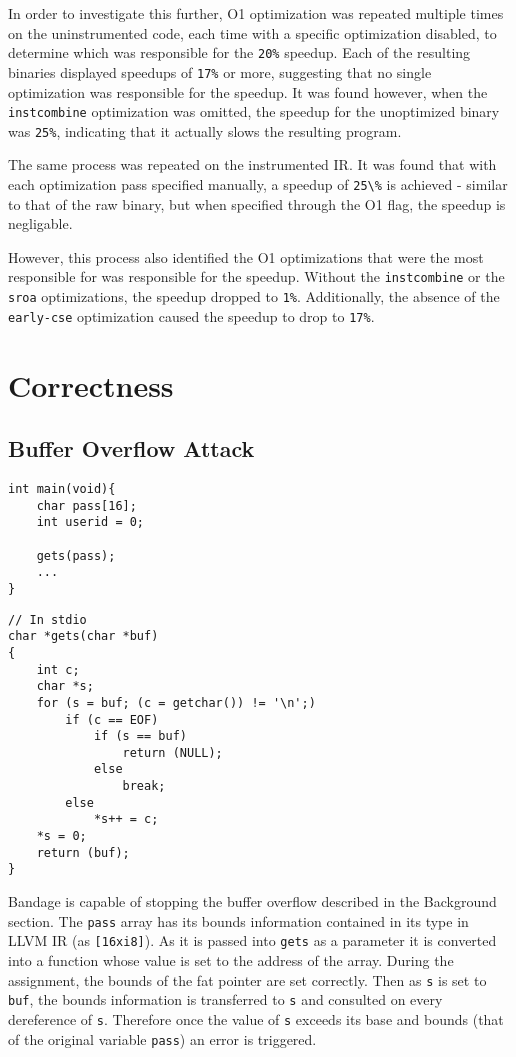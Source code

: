 In order to investigate this further, O1 optimization was repeated multiple times on the uninstrumented code, each time with a specific optimization disabled, to determine which was responsible for the \verb!20%! speedup.
Each of the resulting binaries displayed speedups of \verb!17%! or more, suggesting that no single optimization was responsible for the speedup.
It was found however, when the \verb!instcombine! optimization was omitted, the speedup for the unoptimized binary was \verb!25%!, indicating that it actually slows the resulting program.

The same process was repeated on the instrumented IR.
It was found that with each optimization pass specified manually, a speedup of \verb!25\%! is achieved - similar to that of the raw binary, but when specified through the O1 flag, the speedup is negligable.

However, this process also identified the O1 optimizations that were the most responsible for was responsible for the speedup.
Without the \verb!instcombine! or the \verb!sroa! optimizations, the speedup dropped to \verb!1%!.
Additionally, the absence of the \verb!early-cse! optimization caused the speedup to drop to \verb!17%!.

\section{Correctness}

\subsection{Buffer Overflow Attack}

\begin{verbatim}
int main(void){
    char pass[16];
    int userid = 0;

    gets(pass);
    ...
}
\end{verbatim}

\begin{verbatim}
// In stdio
char *gets(char *buf)
{
    int c;
    char *s;
    for (s = buf; (c = getchar()) != '\n';)
        if (c == EOF)
            if (s == buf)
                return (NULL);
            else
                break;
        else
            *s++ = c;
    *s = 0;
    return (buf);
}
\end{verbatim}
Bandage is capable of stopping the buffer overflow described in the Background section.
The \verb!pass! array has its bounds information contained in its type in LLVM IR (as \verb![16xi8]!).
As it is passed into \verb!gets! as a parameter it is converted into a function whose value is set to the address of the array.
During the assignment, the bounds of the fat pointer are set correctly.
Then as \verb!s! is set to \verb!buf!, the bounds information is transferred to \verb!s! and consulted on every dereference of \verb!s!.
Therefore once the value of \verb!s! exceeds its base and bounds (that of the original variable \verb!pass!) an error is triggered.

